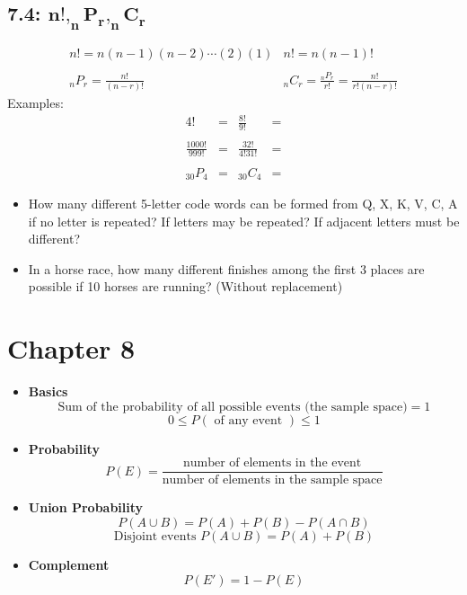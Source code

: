 \documentclass[12pt]{article}
\begin{document}
\subsection*{7.4: $\mathbf{n!, _nP_r, _nC_r}$}
\begin{align*}
	&n! = n(n-1)(n-2)\cdots (2)(1) & n! = n(n-1)!& \\\\
	&_nP_r = \frac{n!}{(n-r)!} & _nC_r = \frac{_nP_r}{r!} = \frac{n!}{r!(n-r)!}&
\end{align*}
Examples:
\begin{align*}
	4! &=  & \frac{8!}{9!} &= \\\\
	\frac{1000!}{999!} &= &  \frac{32!}{4!31!} &= \\\\
	_{30}P_4 &= & _{30}C_4&=
\end{align*}
\begin{itemize}
	\item How many different 5-letter code words can be formed from Q, X, K, V, C, A if no letter is repeated? If letters may be repeated? If adjacent letters must be different?
	\item In a horse race, how many different finishes among the first 3 places are possible if 10 horses are running? (Without replacement)
	
\end{itemize}


\section*{Chapter 8}

\begin{itemize}
\item \textbf{Basics}
$$\text{Sum of the probability of all possible events (the sample space)}  = 1$$
$$0\leq P(\text{ of any event }) \leq 1$$
\item \textbf{Probability}
$$P(E) = \frac{\text{number of elements in the event}}{\text{number of elements in the sample space}}$$

\item \textbf{Union Probability}\\

$$P(A \cup B) = P(A) + P(B) - P(A \cap B)$$
$$\text{Disjoint events }P(A \cup B) = P(A) + P(B)$$
\item \textbf{Complement}
$$P(E') = 1-P(E)$$
\end{itemize}
\end{document}
